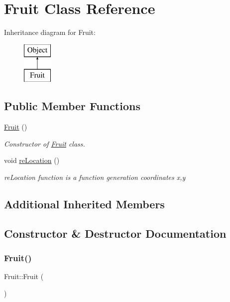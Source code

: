 \hypertarget{class_fruit}{}\section{Fruit Class Reference}
\label{class_fruit}
Inheritance diagram for Fruit\+:\begin{figure}[H]
\begin{center}
\leavevmode
\includegraphics[height=2.000000cm]{class_fruit}
\end{center}
\end{figure}
\subsection*{Public Member Functions}
\begin{DoxyCompactItemize}
\item 
\hyperlink{class_fruit_aa40ce1fdb1b361880d27171f05a2ab5a}{Fruit} ()
\begin{DoxyCompactList}\small\item\em Constructor of \hyperlink{class_fruit}{Fruit} class. \end{DoxyCompactList}\item 
void \hyperlink{class_fruit_a1fdcbedbadc7809aceaffd4164754c25}{re\+Location} ()
\begin{DoxyCompactList}\small\item\em re\+Location function is a function generation coordinates x,y \end{DoxyCompactList}\end{DoxyCompactItemize}
\subsection*{Additional Inherited Members}


\subsection{Constructor \& Destructor Documentation}
\mbox{\label{class_fruit_aa40ce1fdb1b361880d27171f05a2ab5a}} 
\subsubsection{\texorpdfstring{Fruit()}{Fruit()}}
{\footnotesize\ttfamily Fruit\+::\+Fruit (\begin{DoxyParamCaption}{ }\end{DoxyParamCaption})}



